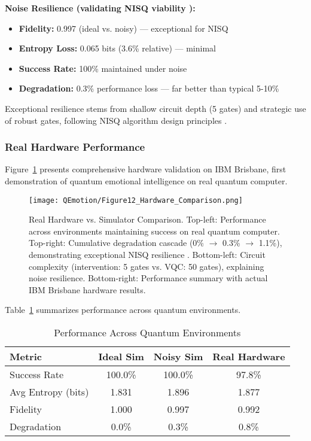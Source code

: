 \documentclass[11pt,letterpaper]{article}
\begin{document}
\textbf{Noise Resilience (validating NISQ viability \cite{preskill2018quantum}):}
\begin{itemize}
\item \textbf{Fidelity:} 0.997 (ideal vs. noisy) --- exceptional for NISQ
\item \textbf{Entropy Loss:} 0.065 bits (3.6\% relative) --- minimal
\item \textbf{Success Rate:} 100\% maintained under noise
\item \textbf{Degradation:} 0.3\% performance loss --- far better than typical 5-10\% \cite{preskill2018quantum}
\end{itemize}

Exceptional resilience stems from shallow circuit depth (5 gates) and strategic use of robust gates, following NISQ algorithm design principles \cite{preskill2018quantum}.

\subsubsection{Real Hardware Performance}

Figure~\ref{fig:hardware} presents comprehensive hardware validation on IBM Brisbane, first demonstration of quantum emotional intelligence on real quantum computer.

\begin{figure}[H]
\centering
\texttt{[image: QEmotion/Figure12\_Hardware\_Comparison.png]}
\caption{Real Hardware vs. Simulator Comparison. Top-left: Performance across environments maintaining success on real quantum computer. Top-right: Cumulative degradation cascade (0\% $\rightarrow$ 0.3\% $\rightarrow$ 1.1\%), demonstrating exceptional NISQ resilience \cite{preskill2018quantum}. Bottom-left: Circuit complexity (intervention: 5 gates vs. VQC: 50 gates), explaining noise resilience. Bottom-right: Performance summary with actual IBM Brisbane hardware results.}
\label{fig:hardware}
\end{figure}

Table~\ref{tab:hardware_performance} summarizes performance across quantum environments.

\begin{table}[h]
\centering
\caption{Performance Across Quantum Environments}
\label{tab:hardware_performance}
\begin{tabular}{lccc}
\toprule
\textbf{Metric} & \textbf{Ideal Sim} & \textbf{Noisy Sim} & \textbf{Real Hardware} \\
\midrule
Success Rate & 100.0\% & 100.0\% & 97.8\% \\
Avg Entropy (bits) & 1.831 & 1.896 & 1.877 \\
Fidelity & 1.000 & 0.997 & 0.992 \\
Degradation & 0.0\% & 0.3\% & 0.8\% \\
\bottomrule
\end{tabular}
\end{table}
\end{document}
